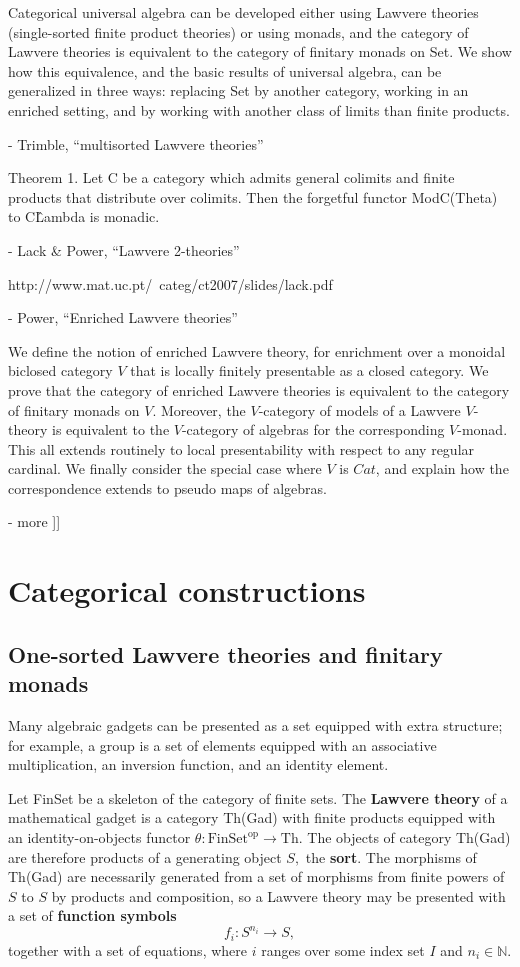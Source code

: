 \documentclass{article}
\newcommand{\maps}{\colon}
\newcommand{\FinSet}{\mathrm{FinSet}}
\newcommand{\op}{\mathrm{op}}
\newcommand{\NN}{\mathbb{N}}
\begin{document}
  Categorical universal algebra can be developed either using Lawvere theories (single-sorted finite product theories) or using monads, and the category of Lawvere theories is equivalent to the category of finitary monads on Set. We show how this equivalence, and the basic results of universal algebra, can be generalized in three ways: replacing Set by another category, working in an enriched setting, and by working with another class of limits than finite products.
  
- Trimble, ``multisorted Lawvere theories''

  Theorem 1. Let C be a category which admits general colimits and finite products that distribute over colimits. Then the forgetful functor ModC(Theta) to C\^Lambda is monadic.

- Lack \& Power, ``Lawvere 2-theories''

  http://www.mat.uc.pt/~categ/ct2007/slides/lack.pdf

- Power, ``Enriched Lawvere theories''

  We define the notion of enriched Lawvere theory, for enrichment over a monoidal biclosed category $V$ that is locally finitely presentable as a closed category. We prove that the category of enriched Lawvere theories is equivalent to the category of finitary monads on $V$. Moreover, the $V$-category of models of a Lawvere $V$-theory is equivalent to the $V$-category of algebras for the corresponding $V$-monad. This all extends routinely to local presentability with respect to any regular cardinal. We finally consider the special case where $V$ is $Cat$, and explain how the correspondence extends to pseudo maps of algebras.

- more
]]

\section{Categorical constructions}

\subsection{One-sorted Lawvere theories and finitary monads}

Many algebraic gadgets can be presented as a set equipped with extra structure; for example, a group is a set of elements equipped with an associative multiplication, an inversion function, and an identity element.

Let FinSet be a skeleton of the category of finite sets.  The {\bf Lawvere theory} of a mathematical gadget is a category Th(Gad) with finite products equipped with an identity-on-objects functor $\theta\maps \FinSet^\op \to \mathrm{Th}.$  The objects of category Th(Gad) are therefore products of a generating object $S,$ the {\bf sort}.  The morphisms of Th(Gad) are necessarily generated from a set of morphisms from finite powers of $S$ to $S$ by products and composition, so a Lawvere theory may be presented with a set of {\bf function symbols}
\[ f_i\maps S^{n_i} \to S, \]
together with a set of equations, where $i$ ranges over some index set $I$ and $n_i \in \NN$.
\end{document}
